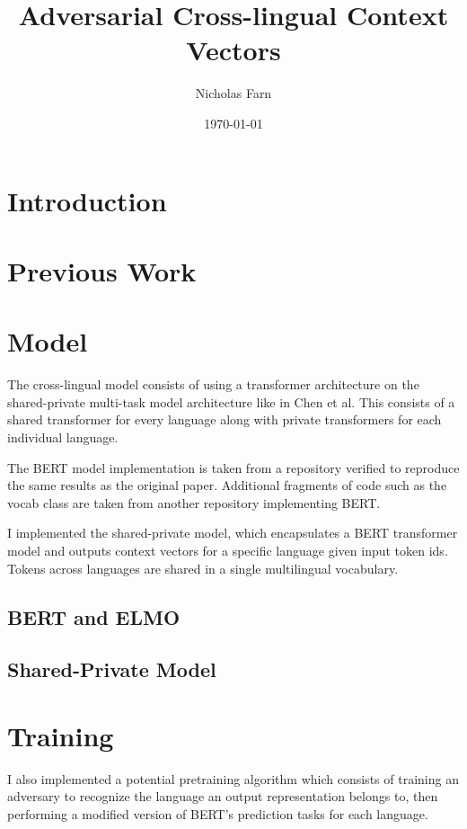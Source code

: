 \documentclass[12pt,letterpaper]{article}
\title{Adversarial Cross-lingual Context Vectors}
\author{Nicholas Farn}
\date{\today}
\begin{document}
\maketitle
\begin{abstract}
	\lipsum[1]
\end{abstract}

\begin{multicols}{2}
\section{Introduction}
\lipsum[1]

\section{Previous Work}
\lipsum[1]

\section{Model}
The cross-lingual model consists of using a transformer architecture on the shared-private multi-task model architecture like in Chen et al.  This consists of a shared transformer for every language along with private transformers for each individual language.

The BERT model implementation is taken from a repository verified to reproduce the same results as the original paper.  Additional fragments of code such as the vocab class are taken from another repository implementing BERT.

I implemented the shared-private model, which encapsulates a BERT transformer model and outputs context vectors for a specific language given input token ids.  Tokens across languages are shared in a single multilingual vocabulary.

\subsection{BERT and ELMO}
\lipsum[1]

\subsection{Shared-Private Model}
\lipsum[1]

\section{Training}
I also implemented a potential pretraining algorithm which consists of training an adversary to recognize the language an output representation belongs to, then performing a modified version of BERT’s prediction tasks for each language.


\end{multicols}
\end{document}
